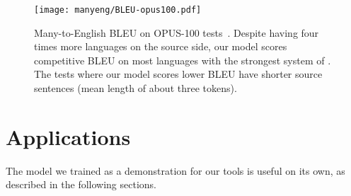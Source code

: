 \begin{figure}[ht]
    \centering
    \texttt{[image: manyeng/BLEU-opus100.pdf]}
    \caption[Many-to-English model's BLEU scores on OPUS-100 test set]{Many-to-English BLEU on OPUS-100 tests~\cite{zhang-etal-2020-multiling-nmt}. 
    Despite having four times more languages on the source side, our model scores competitive BLEU on most languages with the strongest system of \citet{zhang-etal-2020-multiling-nmt}. The tests where our model scores lower BLEU have shorter source sentences (mean length of about three tokens).}
    \label{fig:test-bleu}
\end{figure}

\section{Applications}
\label{sec:value}
The model we trained as a demonstration for our tools is useful on its own, as described in the following sections. 

